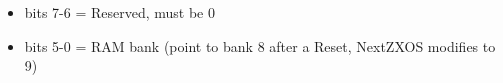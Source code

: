 \begin{itemize}
\item bits 7-6 = Reserved, must be 0
\item bits 5-0 = RAM bank (point to bank 8 after a Reset, NextZXOS
  modifies to 9)
\end{itemize}

